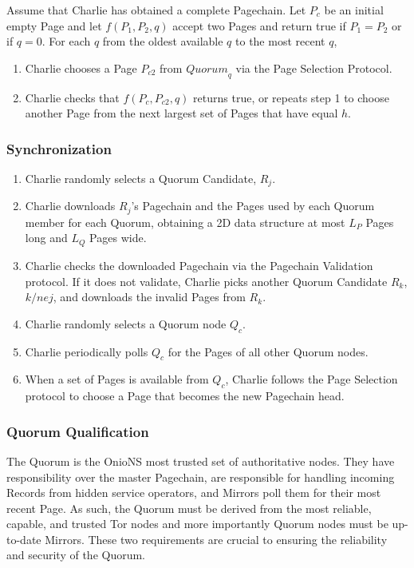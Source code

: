
Assume that Charlie has obtained a complete Pagechain. Let $ P_{c} $ be an initial empty Page and let $ f(P_{1}, P_{2}, q) $ accept two Pages and return true if $ P_{1} = P_{2} $ or if $ q = 0 $. For each $ q $ from the oldest available $ q $ to the most recent $ q $,

\begin{enumerate}
	\item Charlie chooses a Page $ P_{c2} $ from $ \mathit{Quorum}_{q} $ via the Page Selection Protocol.
	\item Charlie checks that $ f(P_{c}, P_{c2}, q) $ returns true, or repeats step 1 to choose another Page from the next largest set of Pages that have equal $ h $.
\end{enumerate}

\subsubsection{Synchronization}

\begin{enumerate}
	\item Charlie randomly selects a Quorum Candidate, $ R_{j} $.
	\item Charlie downloads $ R_{j} $'s Pagechain and the Pages used by each Quorum member for each Quorum, obtaining a 2D data structure at most $ L_{P} $ Pages long and $ L_{Q} $ Pages wide.
	\item Charlie checks the downloaded Pagechain via the Pagechain Validation protocol. If it does not validate, Charlie picks another Quorum Candidate $ R_{k} $, $ k /ne j $, and downloads the invalid Pages from $ R_{k} $.
	\item Charlie randomly selects a Quorum node $ Q_{c} $.
	\item Charlie periodically polls $ Q_{c} $ for the Pages of all other Quorum nodes.
	\item When a set of Pages is available from $ Q_{c} $, Charlie follows the Page Selection protocol to choose a Page that becomes the new Pagechain head.
\end{enumerate}

\subsubsection{Quorum Qualification}

The Quorum is the OnioNS most trusted set of authoritative nodes. They have responsibility over the master Pagechain, are responsible for handling incoming Records from hidden service operators, and Mirrors poll them for their most recent Page. As such, the Quorum must be derived from the most reliable, capable, and trusted Tor nodes and more importantly Quorum nodes must be up-to-date Mirrors. These two requirements are crucial to ensuring the reliability and security of the Quorum.

